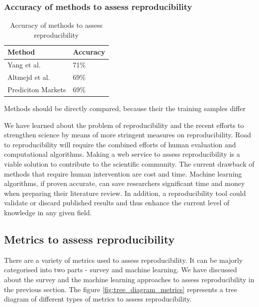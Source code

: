 \documentclass[
10pt, %
a4paper, %
oneside, %
headinclude,footinclude, %
BCOR5mm, %
]{scrartcl}
\begin{document}
\subsubsection{Accuracy of methods to assess reproducibility}
\begin{table}[!ht]
    \centering
    \caption{Accuracy of methods to assess reproducibility}
    \label{table:accuracy_assessment_methods}
    \begin{tabular}{|l|l|}
    \hline
        Method & Accuracy \\ \hline
        Yang et al.  & 71\% \\ \hline
        Altmejd et al.  & 69\% \\ \hline
        Prediciton Markets  & 69\% \\ \hline
    \end{tabular}
\newline\newline \centering * Methods should be directly compared, because their the training samples differ
\end{table}

We have learned about the problem of reproducibility and the recent efforts to strengthen science by means of more stringent measures on reproducibility. 
Road to reproducibility will require the combined efforts of human evaluation and computational algorithms. 
Making a web service to assess reproducibility is a viable solution to contribute to the scientific community. 
The current drawback of methods that require human intervention are cost and time. 
Machine learning algorithms, if proven accurate, can save researchers significant time and money when preparing their literature review. 
In addition, a reproducibility tool could validate or discard published results and thus enhance the current level of knowledge in any given field. 


\subsection{Metrics to assess reproducibility}
There are a variety of metrics used to assess reproducibility. It can be majorly categorised into two parts - survey and machine learning. We have discussed about the survey and the machine learning approaches to assess reproducibility in the previous section. The figure \ref{fig:tree_diagram_metrics} represents a tree diagram of different types of metrics to assess reproducibility. 
\end{document}
